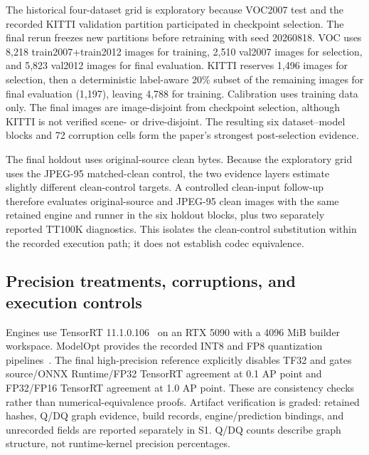 \documentclass[a4paper,fleqn]{cas-dc}
\begin{document}
\begin{table}[t]
\centering
\caption{Frozen evaluation datasets. Counts refer to the converted annotations consumed by the evaluator.}
\label{tab:datasets}
\resizebox{\textwidth}{!}{}
\end{table}

The historical four-dataset grid is exploratory because VOC2007 test and the recorded KITTI validation partition participated in checkpoint selection. The final rerun freezes new partitions before retraining with seed 20260818. VOC uses 8,218 train2007+train2012 images for training, 2,510 val2007 images for selection, and 5,823 val2012 images for final evaluation. KITTI reserves 1,496 images for selection, then a deterministic label-aware 20\% subset of the remaining images for final evaluation (1,197), leaving 4,788 for training. Calibration uses training data only. The final images are image-disjoint from checkpoint selection, although KITTI is not verified scene- or drive-disjoint. The resulting six dataset--model blocks and 72 corruption cells form the paper's strongest post-selection evidence.

The final holdout uses original-source clean bytes. Because the exploratory grid uses the JPEG-95 matched-clean control, the two evidence layers estimate slightly different clean-control targets. A controlled clean-input follow-up therefore evaluates original-source and JPEG-95 clean images with the same retained engine and runner in the six holdout blocks, plus two separately reported TT100K diagnostics. This isolates the clean-control substitution within the recorded execution path; it does not establish codec equivalence.

\subsection{Precision treatments, corruptions, and execution controls}
\label{sec:precision-treatments}
\label{sec:corruptions}
\label{sec:controlled-clean}

Engines use TensorRT 11.1.0.106~\citep{nvidia2026tensorrt} on an RTX 5090 with a 4096 MiB builder workspace. ModelOpt provides the recorded INT8 and FP8 quantization pipelines~\citep{nvidia2026modelopt}. The final high-precision reference explicitly disables TF32 and gates source/ONNX Runtime/FP32 TensorRT agreement at 0.1 AP point and FP32/FP16 TensorRT agreement at 1.0 AP point. These are consistency checks rather than numerical-equivalence proofs. Artifact verification is graded: retained hashes, Q/DQ graph evidence, build records, engine/prediction bindings, and unrecorded fields are reported separately in S1. Q/DQ counts describe graph structure, not runtime-kernel precision percentages.
\end{document}
